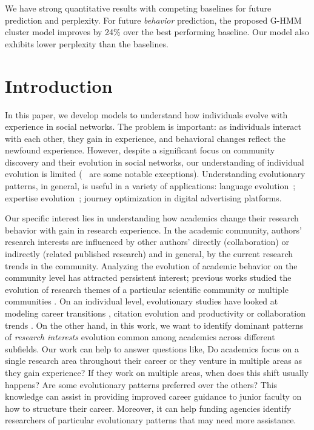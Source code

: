 \documentclass[10pt,letterpaper]{article}
\begin{document}
We have strong quantitative results with competing baselines for future prediction and perplexity. For future \emph{behavior} prediction, the proposed G-HMM cluster model improves by 24\% over the best performing baseline. Our model also exhibits lower perplexity than the baselines.

\linenumbers

\section*{Introduction}
In this paper, we develop models to understand how individuals evolve with experience in social networks. The problem is important: as individuals interact with each other, they gain in experience, and behavioral changes reflect the newfound experience. However, despite a significant focus on community discovery and their evolution in social networks, our understanding of individual evolution is limited (~\cite{Yang:2011, McAuley:2013} are some notable exceptions). Understanding evolutionary patterns, in general, is useful in a variety of applications: language evolution~\cite{Danescu}; expertise evolution~\cite{McAuley:2013}; journey optimization in digital advertising platforms.

Our specific interest lies in understanding how academics change their research behavior with gain in research experience. In the academic community, authors' research interests are influenced by other authors' directly (collaboration) or indirectly (related published research) and in general, by the current research trends in the community. Analyzing the evolution of academic behavior on the community level has attracted persistent interest; previous works studied the evolution of research themes of a particular scientific community \cite{Li:2011} or multiple communities \cite{Biryukov:2010, tanmoy:2013}. %
On an individual level, evolutionary studies have looked at modeling career transitions \cite{Danai:2018}, citation evolution \cite{dashun:2013} and  productivity or collaboration trends \cite{Way:2017}. On the other hand, in this work, we want to identify dominant patterns of \emph{research interests} evolution common among academics across different subfields. Our work can help to answer questions like, Do academics focus on a single research area throughout their career or they venture in multiple areas as they gain experience? If they work on multiple areas, when does this shift usually happens? Are some evolutionary patterns preferred over the others? This knowledge can assist in providing improved career guidance to junior faculty on how to structure their career. Moreover, it can help funding agencies identify researchers of particular evolutionary patterns that may need more assistance.
\end{document}
